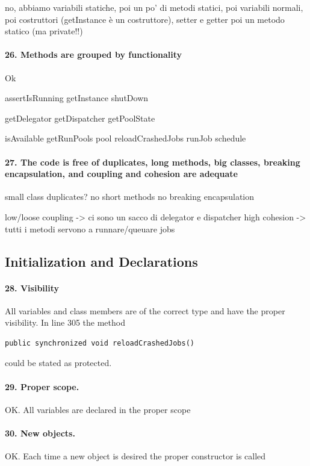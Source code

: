 \documentclass[english]{article}
\begin{document}
no, abbiamo variabili statiche, poi un po' di metodi statici, poi variabili normali, poi costruttori (getInstance è un costruttore), setter e getter poi un metodo statico (ma private!!)


\paragraph{26. Methods are grouped by functionality}
Ok

assertIsRunning
getInstance
shutDown

getDelegator
getDispatcher
getPoolState

isAvailable
getRunPools
pool
reloadCrashedJobs
runJob
schedule

\paragraph{27. The code is free of duplicates, long methods, big classes, breaking encapsulation, and coupling and cohesion are adequate}
small class
duplicates? no
short methods
no breaking encapsulation

low/loose coupling -> ci sono un sacco di delegator e dispatcher
high cohesion -> tutti i metodi servono a runnare/queuare jobs

\subsection{Initialization and Declarations}

\paragraph{28. Visibility}
All variables and class members are of the correct type and have the proper visibility.
In line 305 the method \begin{lstlisting} 
public synchronized void reloadCrashedJobs()
\end{lstlisting} could be stated as protected.

\paragraph{29. Proper scope.} 
OK. All variables are declared in the proper scope

\paragraph{30. New objects.} 
OK. Each time a new object is desired the proper constructor is called
\end{document}

